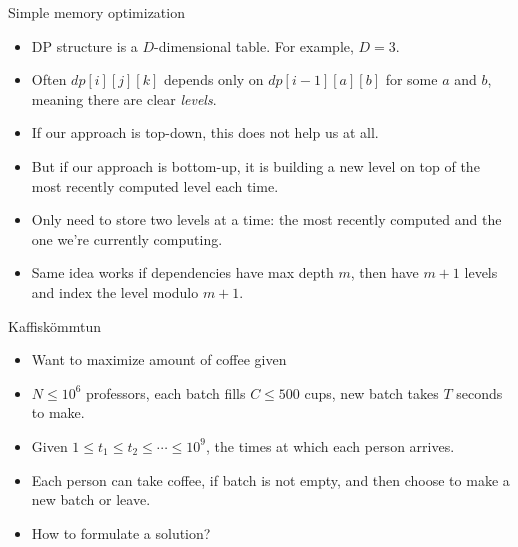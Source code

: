 \documentclass{beamer}
\begin{document}
\begin{frame}[plain]{Simple memory optimization}
    \begin{itemize}
        \item<1-> DP structure is a $D$-dimensional table. For example, $D=3$.
        \item<1-> Often $dp[i][j][k]$ depends only on $dp[i-1][a][b]$ for some $a$ and $b$, meaning there are clear \emph{levels}.
        \item<2-> If our approach is top-down, this does not help us at all.
        \item<2-> But if our approach is bottom-up, it is building a new level on top of the most recently computed level each time.
        \item<3-> Only need to store two levels at a time: the most recently computed and the one we're currently computing.
        \item<3-> Same idea works if dependencies have max depth $m$, then have $m+1$ levels and index the level modulo $m+1$.
    \end{itemize}
\end{frame}


\begin{frame}[plain]{Kaffiskömmtun}
    \begin{itemize}
        \item Want to maximize amount of coffee given
        \item $N \leq 10^6$ professors, each batch fills $C \leq 500$ cups, new batch takes $T$ seconds to make.
        \item Given $1 \leq t_1 \leq t_2 \leq \dotsb \leq 10^9$, the times at which each person arrives.
        \item Each person can take coffee, if batch is not empty, and then choose to make a new batch or leave.
        \item How to formulate a solution?
    \end{itemize}
\end{frame}
\end{document}
